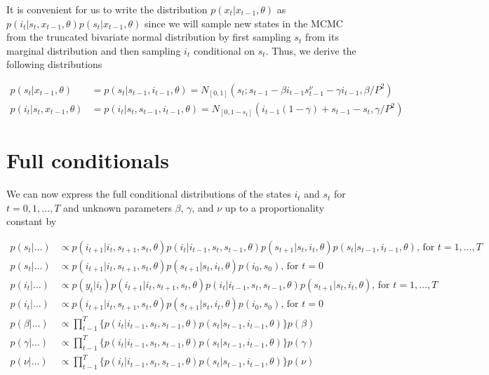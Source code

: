 \documentclass{article}
\begin{document}
It is convenient for us to write the distribution $p(x_t|x_{t-1},\theta)$ as $p(i_t|s_t,x_{t-1},\theta)p(s_t|x_{t-1},\theta)$ since we will sample new states in the MCMC from the truncated bivariate normal distribution by first sampling $s_t$ from its marginal distribution and then sampling $i_t$ conditional on $s_t$. Thus, we derive the following distributions

\begin{align*}
p(s_t|x_{t-1},\theta) &= p(s_t|s_{t-1},i_{t-1},\theta) = N_{[0,1]}(s_t; s_{t-1} - \beta i_{t-1}s^{\nu}_{t-1} - \gamma i_{t-1}, \beta / P^2) \\
p(i_t|s_t,x_{t-1},\theta) &= p(i_t|s_t,s_{t-1},i_{t-1},\theta) = N_{[0,1-s_t]}(i_{t-1}(1 - \gamma) + s_{t-1} - s_t, \gamma / P^2)
\end{align*}

\section{Full conditionals}
We can now express the full conditional distributions of the states $i_t$ and $s_t$ for $t = 0, 1, \ldots, T$ and unknown parameters $\beta$, $\gamma$, and $\nu$ up to a proportionality constant by

\begin{align*}
p(s_t|\hdots) &\propto p(i_{t+1}|i_t,s_{t+1},s_t,\theta)p(i_t|i_{t-1},s_t,s_{t-1},\theta)p(s_{t+1}|s_t,i_t,\theta)p(s_t|s_{t-1},i_{t-1},\theta) \mbox{, for } t = 1,\ldots,T \\
p(s_t|\hdots) &\propto p(i_{t+1}|i_t,s_{t+1},s_t,\theta)p(s_{t+1}|s_t,i_t,\theta)p(i_0,s_0) \mbox{, for } t = 0 \\
p(i_t|\hdots) &\propto p(y_t|i_t)p(i_{t+1}|i_t,s_{t+1},s_t,\theta)p(i_t|i_{t-1},s_t,s_{t-1},\theta)p(s_{t+1}|s_t,i_t,\theta) \mbox{, for } t = 1,\ldots,T \\
p(i_t|\hdots) &\propto p(i_{t+1}|i_t,s_{t+1},s_t,\theta)p(s_{t+1}|s_t,i_t,\theta)p(i_0,s_0) \mbox{, for } t = 0 \\
p(\beta|\hdots) &\propto \prod_{t-1}^T \{p(i_t|i_{t-1},s_t,s_{t-1},\theta)p(s_t|s_{t-1},i_{t-1},\theta)\}p(\beta) \\
p(\gamma|\hdots) &\propto \prod_{t-1}^T \{p(i_t|i_{t-1},s_t,s_{t-1},\theta)p(s_t|s_{t-1},i_{t-1},\theta)\}p(\gamma) \\
p(\nu|\hdots) &\propto \prod_{t-1}^T \{p(i_t|i_{t-1},s_t,s_{t-1},\theta)p(s_t|s_{t-1},i_{t-1},\theta)\}p(\nu)
\end{align*}
\end{document}
